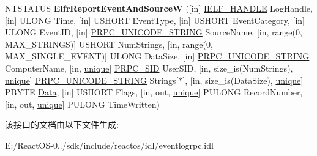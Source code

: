 \begin{DoxyCompactItemize}
N\+T\+S\+T\+A\+T\+US {\bfseries Elfr\+Report\+Event\+And\+SourceW} (\mbox{[}in\mbox{]} \hyperlink{interfacevoid}{I\+E\+L\+F\+\_\+\+H\+A\+N\+D\+LE} Log\+Handle, \mbox{[}in\mbox{]} U\+L\+O\+NG Time, \mbox{[}in\mbox{]} U\+S\+H\+O\+RT Event\+Type, \mbox{[}in\mbox{]} U\+S\+H\+O\+RT Event\+Category, \mbox{[}in\mbox{]} U\+L\+O\+NG Event\+ID, \mbox{[}in\mbox{]} \hyperlink{struct___r_p_c___u_n_i_c_o_d_e___s_t_r_i_n_g}{P\+R\+P\+C\+\_\+\+U\+N\+I\+C\+O\+D\+E\+\_\+\+S\+T\+R\+I\+NG} Source\+Name, \mbox{[}in, range(0, M\+A\+X\+\_\+\+S\+T\+R\+I\+N\+GS)\mbox{]} U\+S\+H\+O\+RT Num\+Strings, \mbox{[}in, range(0, M\+A\+X\+\_\+\+S\+I\+N\+G\+L\+E\+\_\+\+E\+V\+E\+NT)\mbox{]} U\+L\+O\+NG Data\+Size, \mbox{[}in\mbox{]} \hyperlink{struct___r_p_c___u_n_i_c_o_d_e___s_t_r_i_n_g}{P\+R\+P\+C\+\_\+\+U\+N\+I\+C\+O\+D\+E\+\_\+\+S\+T\+R\+I\+NG} Computer\+Name, \mbox{[}in, \hyperlink{interfaceunique}{unique}\mbox{]} \hyperlink{struct___r_p_c___s_i_d}{P\+R\+P\+C\+\_\+\+S\+ID} User\+S\+ID, \mbox{[}in, size\+\_\+is(Num\+Strings), \hyperlink{interfaceunique}{unique}\mbox{]} \hyperlink{struct___r_p_c___u_n_i_c_o_d_e___s_t_r_i_n_g}{P\+R\+P\+C\+\_\+\+U\+N\+I\+C\+O\+D\+E\+\_\+\+S\+T\+R\+I\+NG} Strings\mbox{[}$\ast$\mbox{]}, \mbox{[}in, size\+\_\+is(Data\+Size), \hyperlink{interfaceunique}{unique}\mbox{]} P\+B\+Y\+TE \hyperlink{struct_data}{Data}, \mbox{[}in\mbox{]} U\+S\+H\+O\+RT Flags, \mbox{[}in, out, \hyperlink{interfaceunique}{unique}\mbox{]} P\+U\+L\+O\+NG Record\+Number, \mbox{[}in, out, \hyperlink{interfaceunique}{unique}\mbox{]} P\+U\+L\+O\+NG Time\+Written)
\end{DoxyCompactItemize}


该接口的文档由以下文件生成\+:\begin{DoxyCompactItemize}
\item 
E\+:/\+React\+O\+S-\/0../sdk/include/reactos/idl/eventlogrpc.\+idl\end{DoxyCompactItemize}
